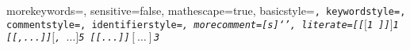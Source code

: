   {
    morekeywords={},
    sensitive=false,
    mathescape=true,
    basicstyle=\footnotesize\tt,
    keywordstyle=\footnotesize\tt,
    commentstyle=\footnotesize\tt,
    identifierstyle=\footnotesize\it,
    morecomment=[s]{`}{'},
    literate={[[}{{$[$}}{1}
             {]]}{{$]$}}{1}
             {[[,...]]}{{$[$, $\ldots]$}}{5}
             {[[...]]}{{$[\ldots]$}}{3}
  }


